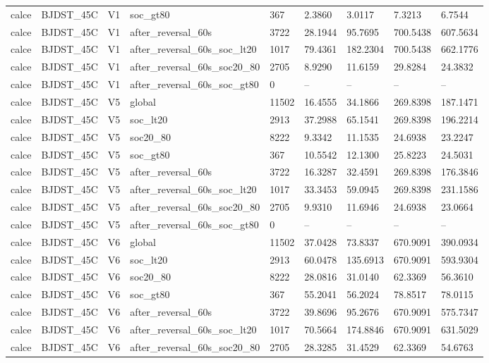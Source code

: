 \begin{tabular}{lllllllll}
calce & BJDST\_45C & V1 & soc\_gt80 & 367 & 2.3860 & 3.0117 & 7.3213 & 6.7544 \\
calce & BJDST\_45C & V1 & after\_reversal\_60s & 3722 & 28.1944 & 95.7695 & 700.5438 & 607.5634 \\
calce & BJDST\_45C & V1 & after\_reversal\_60s\_soc\_lt20 & 1017 & 79.4361 & 182.2304 & 700.5438 & 662.1776 \\
calce & BJDST\_45C & V1 & after\_reversal\_60s\_soc20\_80 & 2705 & 8.9290 & 11.6159 & 29.8284 & 24.3832 \\
calce & BJDST\_45C & V1 & after\_reversal\_60s\_soc\_gt80 & 0 & -- & -- & -- & -- \\
calce & BJDST\_45C & V5 & global & 11502 & 16.4555 & 34.1866 & 269.8398 & 187.1471 \\
calce & BJDST\_45C & V5 & soc\_lt20 & 2913 & 37.2988 & 65.1541 & 269.8398 & 196.2214 \\
calce & BJDST\_45C & V5 & soc20\_80 & 8222 & 9.3342 & 11.1535 & 24.6938 & 23.2247 \\
calce & BJDST\_45C & V5 & soc\_gt80 & 367 & 10.5542 & 12.1300 & 25.8223 & 24.5031 \\
calce & BJDST\_45C & V5 & after\_reversal\_60s & 3722 & 16.3287 & 32.4591 & 269.8398 & 176.3846 \\
calce & BJDST\_45C & V5 & after\_reversal\_60s\_soc\_lt20 & 1017 & 33.3453 & 59.0945 & 269.8398 & 231.1586 \\
calce & BJDST\_45C & V5 & after\_reversal\_60s\_soc20\_80 & 2705 & 9.9310 & 11.6946 & 24.6938 & 23.0664 \\
calce & BJDST\_45C & V5 & after\_reversal\_60s\_soc\_gt80 & 0 & -- & -- & -- & -- \\
calce & BJDST\_45C & V6 & global & 11502 & 37.0428 & 73.8337 & 670.9091 & 390.0934 \\
calce & BJDST\_45C & V6 & soc\_lt20 & 2913 & 60.0478 & 135.6913 & 670.9091 & 593.9304 \\
calce & BJDST\_45C & V6 & soc20\_80 & 8222 & 28.0816 & 31.0140 & 62.3369 & 56.3610 \\
calce & BJDST\_45C & V6 & soc\_gt80 & 367 & 55.2041 & 56.2024 & 78.8517 & 78.0115 \\
calce & BJDST\_45C & V6 & after\_reversal\_60s & 3722 & 39.8696 & 95.2676 & 670.9091 & 575.7347 \\
calce & BJDST\_45C & V6 & after\_reversal\_60s\_soc\_lt20 & 1017 & 70.5664 & 174.8846 & 670.9091 & 631.5029 \\
calce & BJDST\_45C & V6 & after\_reversal\_60s\_soc20\_80 & 2705 & 28.3285 & 31.4529 & 62.3369 & 54.6763 \\

\end{tabular}
